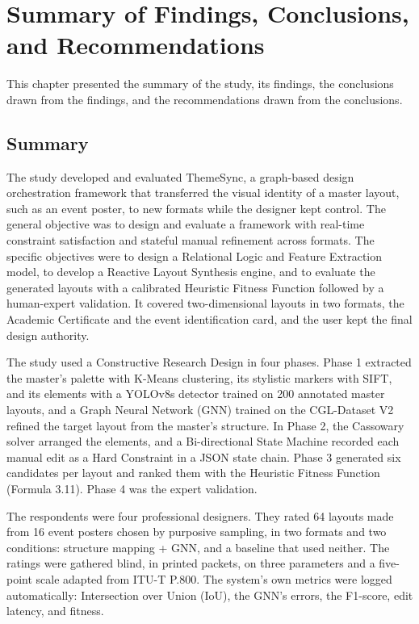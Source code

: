 \chapter{Summary of Findings, Conclusions, and Recommendations}
\begin{refsection}
This chapter presented the summary of the study, its findings, the conclusions drawn from the findings, and the recommendations drawn from the conclusions.

\section{Summary}

The study developed and evaluated ThemeSync, a graph-based design orchestration framework that transferred the visual identity of a master layout, such as an event poster, to new formats while the designer kept control. The general objective was to design and evaluate a framework with real-time constraint satisfaction and stateful manual refinement across formats. The specific objectives were to design a Relational Logic and Feature Extraction model, to develop a Reactive Layout Synthesis engine, and to evaluate the generated layouts with a calibrated Heuristic Fitness Function followed by a human-expert validation. It covered two-dimensional layouts in two formats, the Academic Certificate and the event identification card, and the user kept the final design authority.

The study used a Constructive Research Design in four phases. Phase 1 extracted the master's palette with K-Means clustering, its stylistic markers with SIFT, and its elements with a YOLOv8s detector trained on 200 annotated master layouts, and a Graph Neural Network (GNN) trained on the CGL-Dataset V2 refined the target layout from the master's structure. In Phase 2, the Cassowary solver arranged the elements, and a Bi-directional State Machine recorded each manual edit as a Hard Constraint in a JSON state chain. Phase 3 generated six candidates per layout and ranked them with the Heuristic Fitness Function (Formula 3.11). Phase 4 was the expert validation.

The respondents were four professional designers. They rated 64 layouts made from 16 event posters chosen by purposive sampling, in two formats and two conditions: structure mapping + GNN, and a baseline that used neither. The ratings were gathered blind, in printed packets, on three parameters and a five-point scale adapted from ITU-T P.800. The system's own metrics were logged automatically: Intersection over Union (IoU), the GNN's errors, the F1-score, edit latency, and fitness.


\end{refsection}

